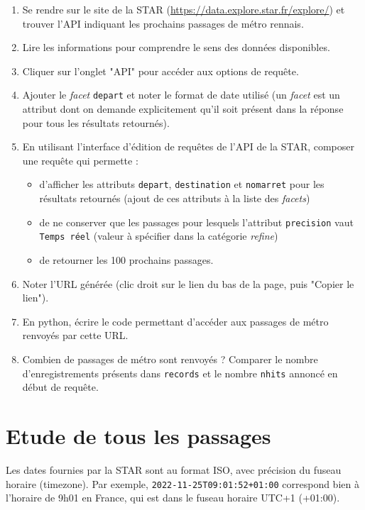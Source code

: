 \documentclass[11pt,a4paper]{article}
\begin{document}
\begin{enumerate}
    \item Se rendre sur le site de la STAR (\url{https://data.explore.star.fr/explore/})
            et trouver l'API indiquant les prochains passages de métro rennais.
    \item Lire les informations pour comprendre le sens des données disponibles.
    \item Cliquer sur l'onglet "API" pour accéder aux options de requête.
    \item Ajouter le \emph{facet} \verb+depart+ et noter le format de date
            utilisé (un \emph{facet} est un attribut dont on demande explicitement qu'il soit 
            présent dans la réponse pour tous les résultats retournés).
    \item En utilisant l'interface d'édition de requêtes de l'API de la STAR, composer une requête qui permette :
    \begin{itemize}
        \item d'afficher les attributs \verb+depart+, \verb+destination+ et \verb+nomarret+ pour les résultats 
            retournés (ajout de ces attributs à la liste des \emph{facets})
        \item de ne conserver que les passages pour lesquels l'attribut \verb+precision+ vaut 
        \verb+Temps réel+ (valeur à spécifier dans la catégorie \emph{refine})
        \item de retourner les 100 prochains passages.
    \end{itemize}
    \item Noter l'URL générée (clic droit sur le lien du bas de la page, puis "Copier le lien").
    \item En python, écrire le code permettant d'accéder aux passages de métro renvoyés par cette URL.
    \item Combien de passages de métro sont renvoyés ? Comparer le nombre d'enregistrements présents dans \verb+records+ et le nombre \verb+nhits+ annoncé en début de requête.
\end{enumerate}

\section{Etude de tous les passages}

Les dates fournies par la STAR sont au format ISO, avec précision du fuseau horaire (timezone). Par exemple, \verb.2022-11-25T09:01:52+01:00. correspond bien à l'horaire de 9h01 en France, qui est dans le fuseau horaire UTC+1 (+01:00).
\end{document}
